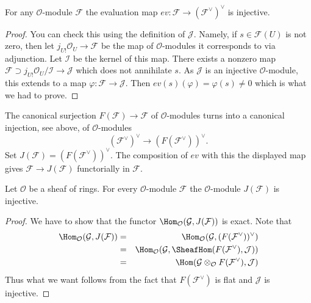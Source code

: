 \begin{lemma}
\label{lemma-ev-injective-sheaves}
For any $\mathcal{O}$-module $\mathcal{F}$ the evaluation map
$ev : \mathcal{F} \to (\mathcal{F}^\vee)^\vee$ is injective.
\end{lemma}

\begin{proof}
You can check this using the definition of $\mathcal{J}$.
Namely, if $s \in \mathcal{F}(U)$ is not zero, then let
$j_{U!}\mathcal{O}_U \to \mathcal{F}$ be the map of
$\mathcal{O}$-modules it corresponds to via adjunction.
Let $\mathcal{I}$ be the kernel of this map. There exists
a nonzero map $\mathcal{F} \supset j_{U!}\mathcal{O}_U/\mathcal{I}
\to \mathcal{J}$ which does not annihilate $s$. As $\mathcal{J}$ is
an injective $\mathcal{O}$-module, this extends to a map
$\varphi : \mathcal{F} \to \mathcal{J}$.
Then $ev(s)(\varphi) = \varphi(s) \not = 0$ which is what we had to prove.
\end{proof}

\noindent
The canonical surjection
$F(\mathcal{F}) \to \mathcal{F}$ of $\mathcal{O}$-modules turns into a
canonical injection, see above, of $\mathcal{O}$-modules
$$
(\mathcal{F}^\vee)^\vee \longrightarrow (F(\mathcal{F}^\vee))^\vee.
$$
Set $J(\mathcal{F}) = (F(\mathcal{F}^\vee))^\vee$.
The composition of $ev$ with this
the displayed map gives
$\mathcal{F} \to J(\mathcal{F})$ functorially in $\mathcal{F}$.

\begin{lemma}
\label{lemma-JM-injective-sheaves}
Let $\mathcal{O}$ be a sheaf of rings.
For every $\mathcal{O}$-module $\mathcal{F}$ the
$\mathcal{O}$-module $J(\mathcal{F})$ is injective.
\end{lemma}

\begin{proof}
We have to show that the functor
$\Hom_\mathcal{O}(\mathcal{G}, J(\mathcal{F}))$
is exact. Note that
\begin{eqnarray*}
\Hom_\mathcal{O}(\mathcal{G}, J(\mathcal{F}))
& = &
\Hom_\mathcal{O}(\mathcal{G}, (F(\mathcal{F}^\vee))^\vee) \\
& = &
\Hom_\mathcal{O}
(\mathcal{G}, \SheafHom(F(\mathcal{F}^\vee), \mathcal{J})) \\
& = &
\Hom(\mathcal{G} \otimes_\mathcal{O} F(\mathcal{F}^\vee), \mathcal{J})
\end{eqnarray*}
Thus what we want follows from the fact that $F(\mathcal{F}^\vee)$
is flat and $\mathcal{J}$ is injective.
\end{proof}

